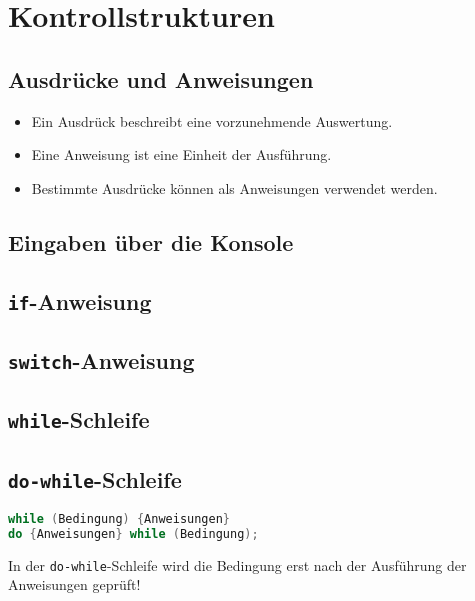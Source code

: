 \chapter{Kontrollstrukturen}

\section{Ausdrücke und Anweisungen}
\begin{itemize}
\item Ein Ausdrück beschreibt eine vorzunehmende Auswertung.
\item Eine Anweisung ist eine Einheit der Ausführung.
\item Bestimmte Ausdrücke können als Anweisungen verwendet werden.
\end{itemize}

\section{Eingaben über die Konsole}


\section{\texttt{if}-Anweisung}


\section{\texttt{switch}-Anweisung}


\section{\texttt{while}-Schleife}


\section{\texttt{do-while}-Schleife}
\begin{lstlisting}[language=Java]
while (Bedingung) {Anweisungen}
do {Anweisungen} while (Bedingung);
\end{lstlisting}

In der \texttt{do-while}-Schleife wird die Bedingung erst nach der Ausführung der Anweisungen geprüft!


